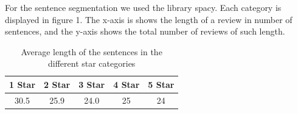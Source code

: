 For the sentence segmentation we used the library spacy. Each category is displayed in figure 1. The x-axis is shows the length of a review in number of sentences, and the y-axis shows the total number of reviews of such length. 
	\begin{center}
		\begin{table}[!h]
			\caption{Average length of the sentences in the different star categories}
			\begin{tabular}{c | c | c | c | c}
				1 Star & 2 Star & 3 Star  & 4 Star & 5 Star\\\hline
				30.5 & 25.9 & 24.0  & 25 & 24\\
			\end{tabular}
		\end{table}
	\end{center}
	
